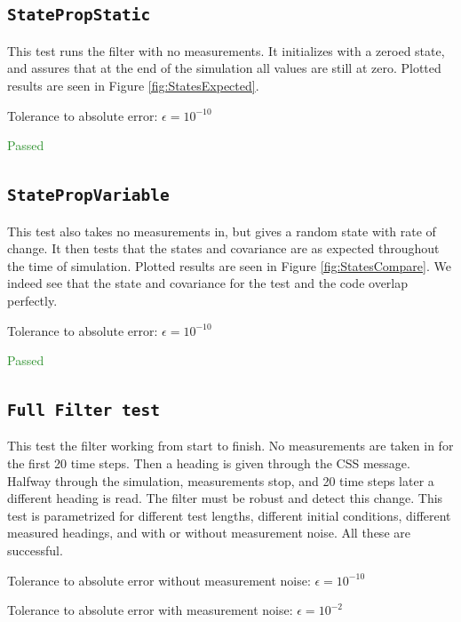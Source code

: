 \documentclass[]{BasiliskReportMemo}
\begin{document}
\subsection{\texttt{StatePropStatic}}

This test runs the filter with no measurements. It initializes with a zeroed state, and assures that at the end of the simulation all values are still at zero. Plotted results are seen in Figure \ref{fig:StatesExpected}.

Tolerance to absolute error: $\epsilon = 10^{-10}$

\textcolor{ForestGreen}{Passed}



\subsection{\texttt{StatePropVariable}}

This test also takes no measurements in, but gives a random state with rate of change. It then tests that the states and covariance are as expected throughout the time of simulation. Plotted results are seen in Figure \ref{fig:StatesCompare}. We indeed see that the state and covariance for the test and the code overlap perfectly.

Tolerance to absolute error: $\epsilon = 10^{-10}$

\textcolor{ForestGreen}{Passed}


\subsection{\texttt{Full Filter test}}

This test the filter working from start to finish. No measurements are taken in for the first 20 time steps. Then a heading is given through the CSS message. Halfway through the simulation, measurements stop, and 20 time steps later a different heading is read. The filter must be robust and detect this change. This test is parametrized for different test lengths, different initial conditions, different measured headings, and with or without measurement noise. All these are successful.

\vspace{0.2cm}
Tolerance to absolute error without measurement noise: $\epsilon = 10^{-10}$

Tolerance to absolute error with measurement noise: $\epsilon = 10^{-2}$
\end{document}

